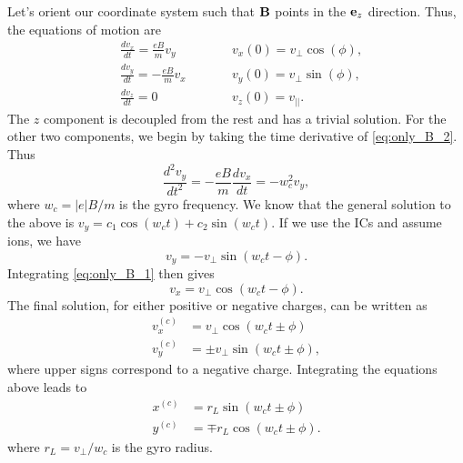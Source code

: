 \documentclass[a4paper,11pt]{report}
\begin{document}
\label{sec:only_B_field}
Let's orient our coordinate system such that $\mathbf{B}$ points in the $\mathbf{e}_z$ direction. Thus, the equations of motion are
\begin{subequations}
\begin{alignat}{2}
    &\frac{d v_x}{dt} = \frac{eB}{m} v_y  \qquad && v_x(0) = v_\perp \cos(\phi), \label{eq:only_B_1} \\
    &\frac{d v_y}{dt} = -\frac{eB}{m} v_x  \qquad && v_y(0) = v_\perp \sin(\phi), \label{eq:only_B_2} \\
    &\frac{d v_z}{dt} = 0  \qquad && v_z(0) = v_{||}. \label{eq:only_B_3}
\end{alignat}
\end{subequations}
The $z$ component is decoupled from the rest and has a trivial solution. For the other two components, we begin by taking the time derivative of \cref{eq:only_B_2}. Thus
\begin{equation}
    \frac{d^2 v_y}{dt^2} = -\frac{eB}{m} \frac{d v_x}{dt} = -w_c^2 v_y,
\end{equation}
where $w_c = |e|B/m$ is the gyro frequency. We know that the general solution to the above is $v_y = c_1 \cos(w_c t) + c_2 \sin(w_c t)$. If we use the ICs and assume ions, we have
\begin{equation}
\label{eq:vel_gyro_y}
    v_y = -v_\perp \sin(w_ct - \phi).
\end{equation}
Integrating \cref{eq:only_B_1} then gives
\begin{equation}
\label{eq:vel_gyro_x}
    v_x = v_\perp \cos(w_c t - \phi).
\end{equation}
The final solution, for either positive or negative charges, can be written as
\begin{align}
\label{eq:vel_gyro}
    v^{(c)}_x &= v_\perp \cos(w_c t \pm \phi) \nonumber \\
    v^{(c)}_y &= \pm v_\perp \sin(w_c t \pm \phi),
\end{align}
where upper signs correspond to a negative charge. Integrating the equations above leads to
\begin{align}
\label{eq:pos_gyro}
    x^{(c)} &= r_L \sin(w_c t \pm \phi) \nonumber \\
    y^{(c)} &= \mp r_L \cos(w_c t \pm \phi).
\end{align}
where $r_L = v_\perp/w_c$ is the gyro radius.

\end{document}
